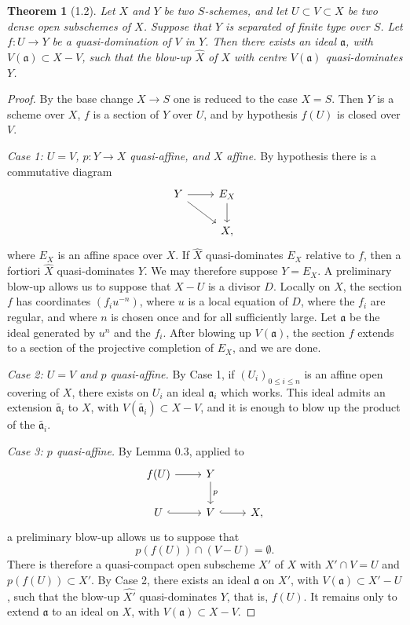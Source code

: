 \documentclass[11pt]{article}
\newtheorem*{theorem}{Theorem}
\newcommand{\tw}[1]{\widetilde{#1}}
\newcommand{\wh}[1]{\widehat{#1}}
\begin{document}
\begin{theorem}[1.2]
Let \(X\) and \(Y\) be two \(S\)-schemes, and let \(U\subset V\subset X\) be two dense open subschemes of \(X\). Suppose that \(Y\) is separated of finite type over \(S\). Let \(f:U\to Y\) be a quasi-domination of \(V\) in \(Y\). Then there exists an ideal \(\mathfrak a\), with \(V(\mathfrak a)\subset X-V\), such that the blow-up \(\wh X\) of \(X\) with centre \(V(\mathfrak a)\) quasi-dominates \(Y\).
\end{theorem}

\begin{proof}
By the base change \(X\to S\) one is reduced to the case \(X=S\). Then \(Y\) is a scheme over \(X\), \(f\) is a section of \(Y\) over \(U\), and by hypothesis \(f(U)\) is closed over \(V\).

\emph{Case 1: \(U=V\), \(p:Y\to X\) quasi-affine, and \(X\) affine.} By hypothesis there is a commutative diagram
\[
\begin{tikzcd}
Y \ar[r] \ar[dr] & E_X \ar[d] \\
& X,
\end{tikzcd}
\]
where \(E_X\) is an affine space over \(X\). If \(\wh X\) quasi-dominates \(E_X\) relative to \(f\), then a fortiori \(\wh X\) quasi-dominates \(Y\). We may therefore suppose \(Y=E_X\). A preliminary blow-up allows us to suppose that \(X-U\) is a divisor \(D\). Locally on \(X\), the section \(f\) has coordinates \((f_i u^{-n})\), where \(u\) is a local equation of \(D\), where the \(f_i\) are regular, and where \(n\) is chosen once and for all sufficiently large. Let \(\mathfrak a\) be the ideal generated by \(u^n\) and the \(f_i\). After blowing up \(V(\mathfrak a)\), the section \(f\) extends to a section of the projective completion of \(E_X\), and we are done.

\emph{Case 2: \(U=V\) and \(p\) quasi-affine.} By Case 1, if \((U_i)_{0\le i\le n}\) is an affine open covering of \(X\), there exists on \(U_i\) an ideal \(\mathfrak a_i\) which works. This ideal admits an extension \(\tw{\mathfrak a_i}\) to \(X\), with \(V(\tw{\mathfrak a_i})\subset X-V\), and it is enough to blow up the product of the \(\tw{\mathfrak a_i}\).

\emph{Case 3: \(p\) quasi-affine.} By Lemma 0.3, applied to
\[
\begin{tikzcd}
f(U) \ar[r] & Y \ar[d,"p"] \\
U \ar[r,hook] & V \ar[r,hook] & X,
\end{tikzcd}
\]
a preliminary blow-up allows us to suppose that
\[
p(f(U))\cap (V-U)=\emptyset.
\]
There is therefore a quasi-compact open subscheme \(X'\) of \(X\) with \(X'\cap V=U\) and \(p(f(U))\subset X'\). By Case 2, there exists an ideal \(\mathfrak a\) on \(X'\), with \(V(\mathfrak a)\subset X'-U\), such that the blow-up \(\wh{X'}\) quasi-dominates \(Y\), that is, \(f(U)\). It remains only to extend \(\mathfrak a\) to an ideal on \(X\), with \(V(\mathfrak a)\subset X-V\).


\end{proof}
\end{document}
